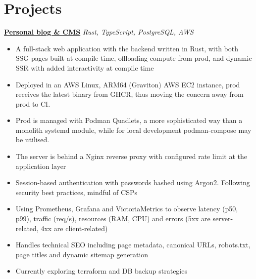 \section{Projects}

\href{https://github.com/Vitor-Curado/BuildHaven/}{\textbf{Personal blog \& CMS}}  
\hfill
\textit{\small Rust, TypeScript, PostgreSQL, AWS}

\begin{itemize}
    \item A full-stack web application with the backend written in Rust, with both SSG pages built at compile time, offloading compute from prod, and dynamic SSR with added interactivity at compile time
    \item Deployed in an AWS Linux, ARM64 (Graviton) AWS EC2 instance, prod receives the latest binary from GHCR, thus moving the concern away from prod to CI. 
    \item Prod is managed with Podman Quadlets, a more sophisticated way than a monolith systemd module, while for local development podman-compose may be utilised.
    \item The server is behind a Nginx reverse proxy with configured rate limit at the application layer
    \item Session-based authentication with passwords hashed using Argon2. Following security best practices, mindful of CSPs
    \item Using Prometheus, Grafana and VictoriaMetrics to observe latency (p50, p99), traffic (req/s), resources (RAM, CPU) and errors (5xx are server-related, 4xx are client-related)
    \item Handles technical SEO including page metadata, canonical URLs, robots.txt, page titles and dynamic sitemap generation
    \item Currently exploring terraform and DB backup strategies
\end{itemize}
